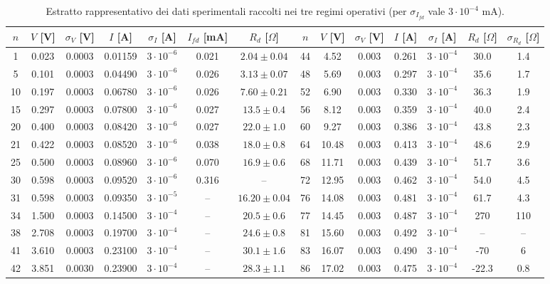 \documentclass[a4paper,11pt]{article}
\begin{document}
\begin{table}[H]
\centering
\scriptsize
\begin{tabular}{ccccccc|ccccccc}
\toprule
$n$ & $V$ [V] & $\sigma_V$ [V] & $I$ [A] & $\sigma_I$ [A] & $I_{fd}$ [mA] & $R_d$ [$\Omega$] & $n$ & $V$ [V] & $\sigma_V$ [V] & $I$ [A] & $\sigma_I$ [A] & $R_d$ [$\Omega$] & $\sigma_{R_d}$ [$\Omega$] \\
\midrule
1 & 0.023 & 0.0003 & 0.01159 & $3\cdot 10^{-6}$ & 0.021 & $2.04 \pm 0.04$ & 44 & 4.52 & 0.003 & 0.261 & $3\cdot 10^{-4}$ & 30.0 & 1.4 \\
5 & 0.101 & 0.0003 & 0.04490 & $3\cdot 10^{-6}$ & 0.026 & $3.13 \pm 0.07$ & 48 & 5.69 & 0.003 & 0.297 & $3\cdot 10^{-4}$ & 35.6 & 1.7 \\
10 & 0.197 & 0.0003 & 0.06780 & $3\cdot 10^{-6}$ & 0.026 & $7.60 \pm 0.21$ & 52 & 6.90 & 0.003 & 0.330 & $3\cdot 10^{-4}$ & 36.3 & 1.9 \\
15 & 0.297 & 0.0003 & 0.07800 & $3\cdot 10^{-6}$ & 0.027 & $13.5 \pm 0.4$ & 56 & 8.12 & 0.003 & 0.359 & $3\cdot 10^{-4}$ & 40.0 & 2.4 \\
20 & 0.400 & 0.0003 & 0.08420 & $3\cdot 10^{-6}$ & 0.027 & $22.0 \pm 1.0$ & 60 & 9.27 & 0.003 & 0.386 & $3\cdot 10^{-4}$ & 43.8 & 2.3 \\
21 & 0.422 & 0.0003 & 0.08520 & $3\cdot 10^{-6}$ & 0.038 & $18.0 \pm 0.8$ & 64 & 10.48 & 0.003 & 0.413 & $3\cdot 10^{-4}$ & 48.6 & 2.9 \\
25 & 0.500 & 0.0003 & 0.08960 & $3\cdot 10^{-6}$ & 0.070 & $16.9 \pm 0.6$ & 68 & 11.71 & 0.003 & 0.439 & $3\cdot 10^{-4}$ & 51.7 & 3.6 \\
30 & 0.598 & 0.0003 & 0.09520 & $3\cdot 10^{-6}$ & 0.316 & -- & 72 & 12.95 & 0.003 & 0.462 & $3\cdot 10^{-4}$ & 54.0 & 4.5 \\
31 & 0.598 & 0.0003 & 0.09350 & $3\cdot 10^{-5}$ & -- & $16.20 \pm 0.04$ & 76 & 14.08 & 0.003 & 0.481 & $3\cdot 10^{-4}$ & 61.7 & 4.3 \\
34 & 1.500 & 0.0003 & 0.14500 & $3\cdot 10^{-4}$ & -- & $20.5 \pm 0.6$ & 77 & 14.45 & 0.003 & 0.487 & $3\cdot 10^{-4}$ & 270 & 110 \\
38 & 2.708 & 0.0003 & 0.19700 & $3\cdot 10^{-4}$ & -- & $24.6 \pm 0.8$ & 81 & 15.60 & 0.003 & 0.492 & $3\cdot 10^{-4}$ & -- & -- \\
41 & 3.610 & 0.0003 & 0.23100 & $3\cdot 10^{-4}$ & -- & $30.1 \pm 1.6$ & 83 & 16.07 & 0.003 & 0.490 & $3\cdot 10^{-4}$ & -70 & 6 \\
42 & 3.851 & 0.0030 & 0.23900 & $3\cdot 10^{-4}$ & -- & $28.3 \pm 1.1$ & 86 & 17.02 & 0.003 & 0.475 & $3\cdot 10^{-4}$ & -22.3 & 0.8 \\
\bottomrule
\end{tabular}
\caption{Estratto rappresentativo dei dati sperimentali raccolti nei tre regimi operativi (per $\sigma_{I_{fd}}$ vale $3\cdot 10^{-4}\text{ mA}$).}
\label{tab:dati}
\end{table}
\end{document}

